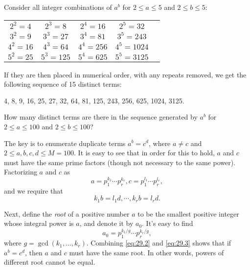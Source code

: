 




Consider all integer combinations of $a^b$ for $2 \le a \le 5$ and $2 \le b \le 5$:
\begin{center}
\begin{tabular}{c c c c c}
$2^2=4$ & $2^3=8$ & $2^4=16$ & $2^5=32$ \\
$3^2=9$ & $3^3=27$ & $3^4=81$ & $3^5=243$ \\
$4^2=16$ & $4^3=64$ & $4^4=256$ & $4^5=1024$ \\
$5^2=25$ & $5^3=125$ & $5^4=625$ & $5^5=3125$ \\
\end{tabular}
\end{center}

If they are then placed in numerical order, with any repeats removed, we get the following sequence of 15 distinct terms:

4, 8, 9, 16, 25, 27, 32, 64, 81, 125, 243, 256, 625, 1024, 3125.

How many distinct terms are there in the sequence generated by $a^b$ for $2 \le a \le 100$ and $2 \le b \le 100$?

\solution

The key is to enumerate duplicate terms $a^b = c^d$, where $a \ne c$ and $2 \le a, b, c, d \le M = 100$. It is easy to see that in order for this to hold, $a$ and $c$ must have the same prime factors (though not necessary to the same power). Factorizing $a$ and $c$ as
\begin{equation}
a = p_1^{k_1} \cdots p_r^{k_r} , c = p_1^{l_1} \cdots p_r^{l_r} , \label{eq:29.1}
\end{equation}
and we require that
\begin{equation}
k_1 b = l_1 d, \cdots, k_r b = l_r d . \label{eq:29.2}
\end{equation}


Next, define the \emph{root} of a positive number $a$ to be the smallest positive integer whose integral power is $a$, and denote it by $a_0$. It's easy to find 
\begin{equation}
a_0 = p_1^{k_1/g} \cdots p_r^{k_r/g}, \label{eq:29.3}
\end{equation}
where $g = \gcd(k_1, \ldots, k_r)$. Combining \eqref{eq:29.2} and \eqref{eq:29.3} shows that if $a^b = c^d$, then $a$ and $c$ must have the same root. In other words, powers of different root cannot be equal.

